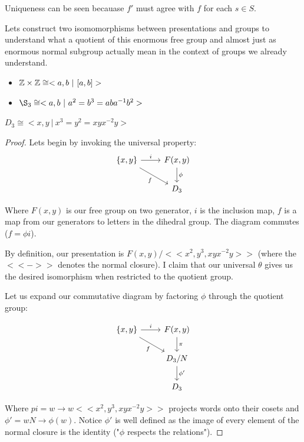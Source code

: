 \documentclass[10pt]{article}
\begin{document}
\begin{definition}
\begin{definition}
\begin{note}
Uniqueness can be seen becauase $f'$ must agree with $f$ for each $s \in S$.

\end{note}

Lets construct two isomomorphisms between presentations and groups to understand
what a quotient of this enormous free group and almost just as enormous normal
subgroup actually mean in the context of groups we already understand.

\begin{itemize}
	\item{$\mathbb{Z} \times \mathbb{Z} \cong <a,b~|~[a,b]>$}
	\item{$\S_3 \cong <a,b~|~a^2=b^3=aba^{-1}b^2>$}
\end{itemize}

\begin{proposition}
	$D_3 \cong <x,y~|~x^3=y^2=xyx^{-2}y>$
\end{proposition}

\begin{proof}

	Lets begin by invoking the universal property:
	\[
	\begin{tikzcd}
	{\{x, y\}} \arrow[rd, "f"'] \arrow[r, "i"] & {F(x, y)} \arrow[d, "\phi"] \\
																						 & D_3                        
	\end{tikzcd}
	\]

	Where $F(x, y)$ is our free group on two generator, $i$ is the inclusion map,
	$f$ is a map from our generators to letters in the dihedral group. The
	diagram commutes ($f = \phi i$).

	By definition, our presentation is $F(x, y) / << x^2, y^3, xyx^{-2}y >>$
	(where the $<<->>$ denotes the normal closure). I claim that our universal
	$\theta$ gives us the desired isomorphism when restricted to the quotient
	group.

	Let us expand our commutative diagram by factoring $\phi$ through the
	quotient group:

	\[
	\begin{tikzcd}
	{\{x, y\}} \arrow[rd, "f"'] \arrow[r, "i"] & {F(x, y)} \arrow[d, "\pi"]   \\
																						 & D_3 / N \arrow[d, "\phi'"] \\
																						 & D_3                         
	\end{tikzcd}
	\]

	Where $pi = w \to w << x^2, y^3, xyx^{-2}y >>$ projects words onto
	their cosets and $\phi' = wN \to \phi(w)$. Notice $\phi'$ is well defined as
	the image of every element of the normal closure is the identity ("$\phi$
	respects the relations").


\end{proof}
\end{definition}
\end{definition}
\end{document}
